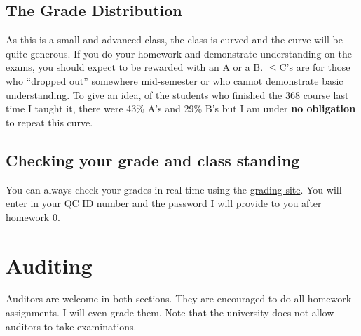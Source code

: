 \documentclass[12pt]{article}
\newcommand{\inred}[1]{\color{red}\textbf{#1} \color{black}}
\newcommand{\qu}[1]{``#1''}
\begin{document}
\subsection*{The Grade Distribution}

As this is a small and advanced class, the class is curved and the curve will be quite generous. If you do your homework and demonstrate understanding on the exams, you should expect to be rewarded with an A or a B. $\leq$C's are for those who \qu{dropped out} somewhere mid-semester or who cannot demonstrate basic understanding. To give an idea, of the students who finished the 368 course last time I taught it, there were 43\% A's and 29\% B's but I am under \inred{no obligation} to repeat this curve.

\subsection*{Checking your grade and class standing}

You can always check your grades in real-time using the \href{http://gradesly.com}{grading site}. You will enter in your QC ID number and the password I will provide to you after homework 0.



\section*{Auditing}

Auditors are welcome in both sections. They are encouraged to do all homework assignments. I will even grade them. Note that the university does not allow auditors to take examinations.
\end{document}
